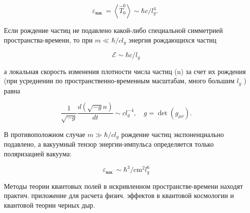 \documentclass[10pt]{article}
\begin{document}
\[

\varepsilon_{\text {вак }}=\left\langle\hat{T}_{0}^{0}\right\rangle \sim \hbar c / l_{g}^{4} \text {. }

\]



Если рождение частиц не подавлено какой-либо специальной симметрией пространства-времени, то при $m \ll \hbar / c l_{g}$ энергия рождающихся частиц



\[

\mathscr{E} \sim \hbar c / l_{g}

\]



а локальная скорость изменения плотности числа частиц (n) за счет их рождения (при усреднении по пространственно-временным масштабам, много большим $l_{g}$ ) равна



\[

\frac{1}{\sqrt{-g}} \frac{d(\sqrt{-g} n)}{d t} \sim c l_{g}^{-4}, \quad g=\operatorname{det}\left(g_{\mu \nu}\right) .

\]



В противоположном случае $m \gg \hbar / c l_{g}$ рождение частиц экспоненциально подавлено, а вакуумный тензор энергии-импульса определяется только поляризацией вакуума:



\[

\varepsilon_{\text {вак }} \sim \hbar^{3} / \mathrm{cm}^{2} l_{g}^{6}

\]



Методы теории квантовых полей в искривленном пространстве-времени находят практич. приложение для расчета физич. эффектов в квантовой космологии и квантовой теории черных дыр.
\end{document}
